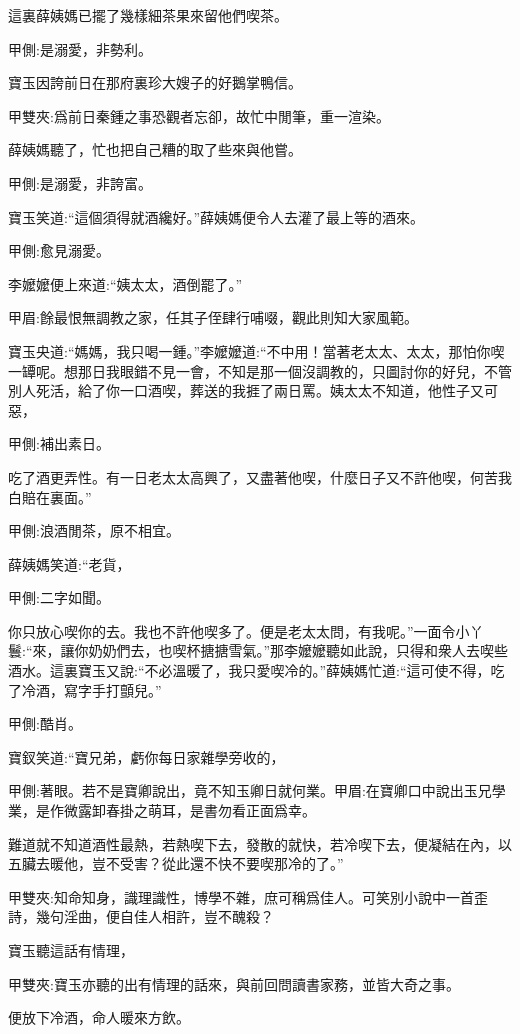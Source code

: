 \begin{parag}
    這裏薛姨媽已擺了幾樣細茶果來留他們喫茶。\begin{note}甲側:是溺愛，非勢利。\end{note}寶玉因誇前日在那府裏珍大嫂子的好鵝掌鴨信。\begin{note}甲雙夾:爲前日秦鍾之事恐觀者忘卻，故忙中閒筆，重一渲染。\end{note}薛姨媽聽了，忙也把自己糟的取了些來與他嘗。\begin{note}甲側:是溺愛，非誇富。\end{note}寶玉笑道:“這個須得就酒纔好。”薛姨媽便令人去灌了最上等的酒來。\begin{note}甲側:愈見溺愛。\end{note}李嬤嬤便上來道:“姨太太，酒倒罷了。”\begin{note}甲眉:餘最恨無調教之家，任其子侄肆行哺啜，觀此則知大家風範。\end{note}寶玉央道:“媽媽，我只喝一鍾。”李嬤嬤道:“不中用！當著老太太、太太，那怕你喫一罈呢。想那日我眼錯不見一會，不知是那一個沒調教的，只圖討你的好兒，不管別人死活，給了你一口酒喫，葬送的我捱了兩日罵。姨太太不知道，他性子又可惡，\begin{note}甲側:補出素日。\end{note}吃了酒更弄性。有一日老太太高興了，又盡著他喫，什麼日子又不許他喫，何苦我白賠在裏面。”\begin{note}甲側:浪酒閒茶，原不相宜。\end{note}薛姨媽笑道:“老貨，\begin{note}甲側:二字如聞。\end{note}你只放心喫你的去。我也不許他喫多了。便是老太太問，有我呢。”一面令小丫鬟:“來，讓你奶奶們去，也喫杯搪搪雪氣。”那李嬤嬤聽如此說，只得和衆人去喫些酒水。這裏寶玉又說:“不必溫暖了，我只愛喫冷的。”薛姨媽忙道:“這可使不得，吃了冷酒，寫字手打顫兒。”\begin{note}甲側:酷肖。\end{note}寶釵笑道:“寶兄弟，虧你每日家雜學旁收的，\begin{note}甲側:著眼。若不是寶卿說出，竟不知玉卿日就何業。甲眉:在寶卿口中說出玉兄學業，是作微露卸春掛之萌耳，是書勿看正面爲幸。\end{note}難道就不知道酒性最熱，若熱喫下去，發散的就快，若冷喫下去，便凝結在內，以五臟去暖他，豈不受害？從此還不快不要喫那冷的了。”\begin{note}甲雙夾:知命知身，識理識性，博學不雜，庶可稱爲佳人。可笑別小說中一首歪詩，幾句淫曲，便自佳人相許，豈不醜殺？\end{note}寶玉聽這話有情理，\begin{note}甲雙夾:寶玉亦聽的出有情理的話來，與前回問讀書家務，並皆大奇之事。\end{note}便放下冷酒，命人暖來方飲。
\end{parag}


